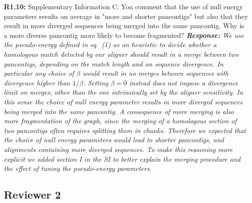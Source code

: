 \documentclass[aps,rmp,onecolumn]{revtex4-1}
\newcommand{\Marco}[1]{{\color{gray}Marco: #1}}
\newcommand{\Liam}[1]{{\color{teal}Liam: #1}}
\newcommand{\reviewer}[2]{\textbf{#1:} #2\vskip 5mm}
\newcommand{\response}[1]{{\it {\color{response}\textbf{Response:} #1}}\vskip 5mm}
\begin{document}
\reviewer{R1.10}{Supplementary Information C: You comment that the use of null energy parameters results on average in "more and shorter pancontigs" but also that they result in more diverged sequences being merged into the same pancontig. Why is a more diverse pancontig more likely to become fragmented?}
\response{We use the pseudo-energy defined in eq.~(1) as an heuristic to decide whether a homologous match detected by our aligner should result in a merge between two pancontigs, depending on the match length and on sequence divergence. In particular any choice of $\beta$ would result in no merges between sequences with divergence higher than $1/\beta$. Setting $\beta=0$ instead does not impose a divergence limit on merges, other than the one intrinsically set by the aligner sensitivity. In this sense the choice of null energy parameter results in more diverged sequences being merged into the same pancontig. A consequence of more merging is also more fragmentation of the graph, since the merging of a homologous section of two pancontigs often requires splitting them in chunks. Therefore we expected that the choice of null energy parameters would lead to shorter pancontigs, and alignments containing more diverged sequences.
      To make this reasoning more explicit we added section I in the SI to better explain the merging procedure and the effect of tuning the pseudo-energy parameters.}


\subsection*{Reviewer 2}
\end{document}

